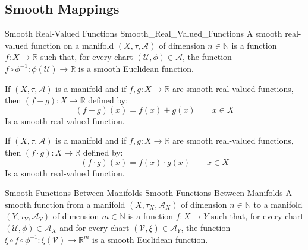 \documentclass[oneside]{book}                                                  %
\begin{document}
            \subsection{Smooth Mappings}
                \begin{fdefinition}{Smooth Real-Valued Functions}
                                   {Smooth_Real_Valued_Functions}
                    A smooth real-valued function on a manifold
                    $(X,\tau,\mathcal{A})$ of dimension $n\in\mathbb{N}$ is a
                    function $f:X\rightarrow\mathbb{R}$ such that, for every chart
                    $(\mathcal{U},\phi)\in\mathcal{A}$, the function
                    $f\circ\phi^{\minus{1}}:\phi(\mathcal{U})\rightarrow\mathbb{R}$
                    is a smooth Euclidean function.
                \end{fdefinition}
                \begin{theorem}
                    If $(X,\tau,\mathcal{A})$ is a manifold and if
                    $f,g:X\rightarrow\mathbb{R}$ are smooth real-valued functions,
                    then $(f+g):X\rightarrow\mathbb{R}$ defined by:
                    \begin{equation}
                        (f+g)(x)=f(x)+g(x)
                        \quad\quad
                        x\in{X}
                    \end{equation}
                    Is a smooth real-valued function.
                \end{theorem}
                \begin{theorem}
                    If $(X,\tau,\mathcal{A})$ is a manifold and if
                    $f,g:X\rightarrow\mathbb{R}$ are smooth real-valued functions,
                    then $(f\cdot{g}):X\rightarrow\mathbb{R}$ defined by:
                    \begin{equation}
                        (f\cdot{g})(x)=f(x)\cdot{g}(x)
                        \quad\quad
                        x\in{X}
                    \end{equation}
                    Is a smooth real-valued function.
                \end{theorem}
                \begin{fdefinition}{Smooth Functions Between Manifolds}
                                   {Smooth Functions Between Manifolds}
                    A smooth function from a manifold $(X,\tau_{X},\mathcal{A}_{X})$
                    of dimension $n\in\mathbb{N}$ to a manifold
                    $(Y,\tau_{Y},\mathcal{A}_{Y})$ of dimension $m\in\mathbb{N}$ is
                    a function $f:X\rightarrow{Y}$ such that, for every chart
                    $(\mathcal{U},\phi)\in\mathcal{A}_{X}$ and for every chart
                    $(\mathcal{V},\xi)\in\mathcal{A}_{Y}$, the function
                    $\xi\circ{f}\circ\phi^{\minus{1}}:\xi(\mathcal{V})%
                     \rightarrow\mathbb{R}^{m}$ is a smooth Euclidean function.
                \end{fdefinition}
\end{document}
